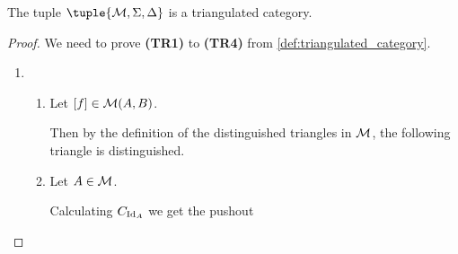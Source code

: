 \begin{example}
    \label{example:stable_module_category_triangulated}
    The tuple \( \tuple{\Mc, \Sigma, \Delta} \) is a triangulated category.
\end{example}
\begin{proof} %
    We need to prove {\bf (TR1)} to {\bf (TR4)} from \autoref{def:triangulated_category}.

    \begin{enumerate}[label={(\bfseries TR\arabic*)}]
        \item {
            \begin{enumerate}
                \item {
                    Let \( [f] \in {\mathcal{M}}(A, B) \).
                    
                    Then by the definition of the distinguished triangles in \( {\mathcal{M}} \), the following triangle is distinguished.
                    \begin{center}
                    \end{center}
                }
                \item {
                    Let \( A \in {\mathcal{M}} \).
                    
                    Calculating \( C_{\operatorname{Id}_A} \) we get the pushout
                    \begin{center}
\end{center}}
\end{enumerate}}
\end{enumerate}
\end{proof}
